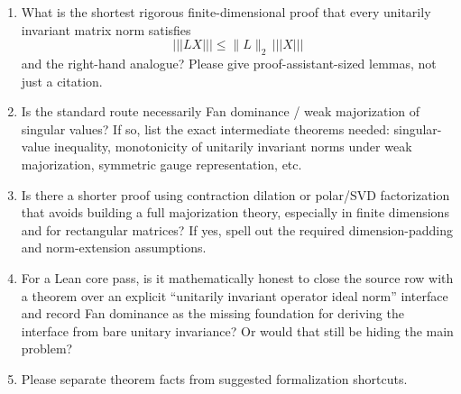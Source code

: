 \documentclass{article}
\begin{document}
\begin{enumerate}
\item What is the shortest rigorous finite-dimensional proof that every
unitarily invariant matrix norm satisfies
\[
  |||LX||| \le \|L\|_2\,|||X|||
\]
and the right-hand analogue?  Please give proof-assistant-sized lemmas, not just
a citation.
\item Is the standard route necessarily Fan dominance / weak majorization of
singular values?  If so, list the exact intermediate theorems needed:
singular-value inequality, monotonicity of unitarily invariant norms under weak
majorization, symmetric gauge representation, etc.
\item Is there a shorter proof using contraction dilation or polar/SVD
factorization that avoids building a full majorization theory, especially in
finite dimensions and for rectangular matrices?  If yes, spell out the required
dimension-padding and norm-extension assumptions.
\item For a Lean core pass, is it mathematically honest to close the source row
with a theorem over an explicit ``unitarily invariant operator ideal norm''
interface and record Fan dominance as the missing foundation for deriving the
interface from bare unitary invariance?  Or would that still be hiding the main
problem?
\item Please separate theorem facts from suggested formalization shortcuts.
\end{enumerate}
\end{document}
